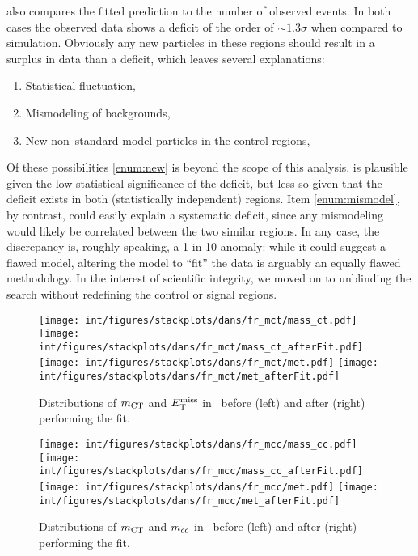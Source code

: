  also compares the fitted prediction to the number of observed events. In both cases the observed data shows a deficit of the order of $\sim 1.3 \sigma$ when compared to simulation. Obviously any new particles in these regions should result in a surplus in data than a deficit, which leaves several explanations:
\begin{enumerate}
\item Statistical fluctuation, \label{enum:statfluc}
\item Mismodeling of backgrounds, \label{enum:mismodel}
\item New non--standard-model particles in the control regions, \label{enum:new}
\end{enumerate}
Of these possibilities \cref{enum:new} is beyond the scope of this analysis.
 is plausible given the low statistical significance of
the deficit, but less-so given that the deficit exists in both (statistically independent) regions. Item \cref{enum:mismodel}, by contrast,
could easily explain a systematic deficit, since any mismodeling would likely be correlated between the two similar regions. In any case, the
discrepancy is, roughly speaking, a 1 in 10 anomaly: while it could suggest a flawed model, altering the model to ``fit'' the data is arguably an equally flawed methodology. In the interest of scientific integrity, we
moved on to unblinding the search without redefining the control or signal
regions.

\begin{figure}[!p]
\centering
\texttt{[image: int/figures/stackplots/dans/fr\_mct/mass\_ct.pdf]}
\texttt{[image: int/figures/stackplots/dans/fr\_mct/mass\_ct\_afterFit.pdf]}\\
\texttt{[image: int/figures/stackplots/dans/fr\_mct/met.pdf]}
\texttt{[image: int/figures/stackplots/dans/fr\_mct/met\_afterFit.pdf]}
\caption[Distributions of $\mct$ and $\met$ in \vrmct\ before and after the fit]{Distributions of $\mct$ and $\met$ in \vrmct\ before (left) and after (right) performing the fit.}
\label{fig:dist-vrmct}
\end{figure}

\begin{figure}[!p]
\centering
\texttt{[image: int/figures/stackplots/dans/fr\_mcc/mass\_cc.pdf]}
\texttt{[image: int/figures/stackplots/dans/fr\_mcc/mass\_cc\_afterFit.pdf]}\\
\texttt{[image: int/figures/stackplots/dans/fr\_mcc/met.pdf]}
\texttt{[image: int/figures/stackplots/dans/fr\_mcc/met\_afterFit.pdf]}
\caption[Distributions of $\mct$ and $\mcc$ in the \vrmcc\ region before and after the fit.]{Distributions of $\mct$ and $\mcc$ in \vrmcc\ before (left) and after (right) performing the fit.}
\label{fig:dist-vrmcc}
\end{figure}


